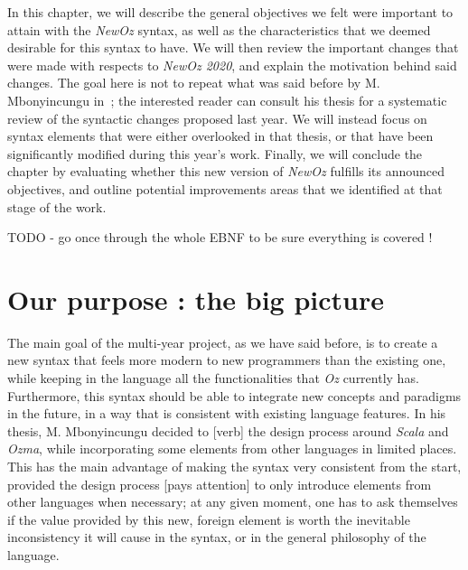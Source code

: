 
In this chapter, we will describe the general objectives we felt were important to attain with the \textit{NewOz} syntax, as well as the characteristics that we deemed desirable for this syntax to have.
We will then review the important changes that were made  with respects to \textit{NewOz 2020}, and explain the motivation behind said changes.
The goal here is not to repeat what was said before by M. Mbonyincungu in~\cite{jpthesis};
the interested reader can consult his thesis for a systematic review of the syntactic changes proposed last year.
We will instead focus on syntax elements that were either overlooked in that thesis, or that have been significantly modified during this year's work.
Finally, we will conclude the chapter by evaluating whether this new version of \textit{NewOz} fulfills its announced objectives, and outline potential improvements areas that we identified at that stage of the work.\newline

TODO - go once through the whole EBNF to be sure everything is covered !

\section{Our purpose : the big picture}\label{sec:ch2-goal}
The main goal of the multi-year project, as we have said before, is to create a new syntax that feels more modern to new programmers than the existing one, while keeping in the language all the functionalities that \textit{Oz} currently has.
Furthermore, this syntax should be able to integrate new concepts and paradigms in the future, in a way that is consistent with existing language features.
In his thesis, M. Mbonyincungu decided to [verb] the design process around \textit{Scala} and \textit{Ozma}, while incorporating some elements from other languages in limited places.
This has the main advantage of making the syntax very consistent from the start, provided the design process [pays attention] to only introduce elements from other languages when necessary;
at any given moment, one has to ask themselves if the value provided by this new, foreign element is worth the inevitable inconsistency it will cause in the syntax, or in the general philosophy of the language.\newline

